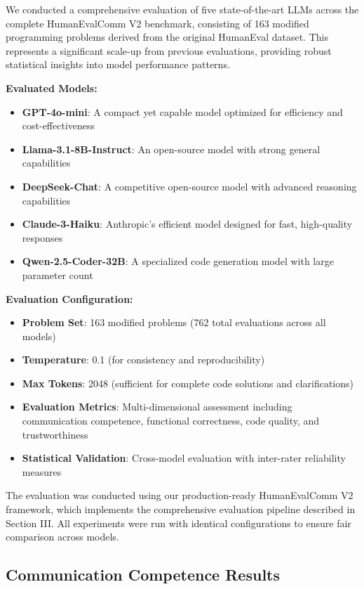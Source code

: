 \documentclass[conference]{IEEEtran}
\begin{document}
We conducted a comprehensive evaluation of five state-of-the-art LLMs across the complete HumanEvalComm V2 benchmark, consisting of 163 modified programming problems derived from the original HumanEval dataset. This represents a significant scale-up from previous evaluations, providing robust statistical insights into model performance patterns.

\textbf{Evaluated Models:}

\begin{itemize}
    \item \textbf{GPT-4o-mini}: A compact yet capable model optimized for efficiency and cost-effectiveness
    \item \textbf{Llama-3.1-8B-Instruct}: An open-source model with strong general capabilities
    \item \textbf{DeepSeek-Chat}: A competitive open-source model with advanced reasoning capabilities
    \item \textbf{Claude-3-Haiku}: Anthropic's efficient model designed for fast, high-quality responses
    \item \textbf{Qwen-2.5-Coder-32B}: A specialized code generation model with large parameter count
\end{itemize}

\textbf{Evaluation Configuration:}

\begin{itemize}
    \item \textbf{Problem Set}: 163 modified problems (762 total evaluations across all models)
    \item \textbf{Temperature}: 0.1 (for consistency and reproducibility)
    \item \textbf{Max Tokens}: 2048 (sufficient for complete code solutions and clarifications)
    \item \textbf{Evaluation Metrics}: Multi-dimensional assessment including communication competence, functional correctness, code quality, and trustworthiness
    \item \textbf{Statistical Validation}: Cross-model evaluation with inter-rater reliability measures
\end{itemize}

The evaluation was conducted using our production-ready HumanEvalComm V2 framework, which implements the comprehensive evaluation pipeline described in Section III. All experiments were run with identical configurations to ensure fair comparison across models.

\subsection{Communication Competence Results}
\end{document}
